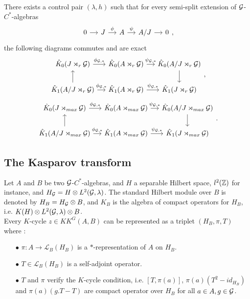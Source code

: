 \begin{prop}
There exists a control pair $(\lambda,h)$ such that for every semi-split extension of $\mathcal G$-$C^*$-algebras
\[\begin{tikzcd}[column sep = small]
0 \arrow{r} & J\arrow{r}{\phi}& A \arrow{r}{\psi} & A/J \arrow{r} & 0
\end{tikzcd},\]
the following diagrams commutes and are exact 
\[\begin{tikzcd}[column sep = small]
\hat K_0(J\rtimes_r \G) \arrow{r}{\phi_{\G,*}}&\hat K_0( A\rtimes_r \G ) \arrow{r}{\psi_{\G,*}} & \hat K_0( A/J\rtimes_r \G) \arrow{d} \\
\hat K_1(A/J\rtimes_r \G) \arrow{u} \arrow{r}{\phi_{\G,*}}& \hat K_1( A\rtimes_r \G ) \arrow{r}{\psi_{\G,*}} & \hat K_1( J\rtimes_r \G)
\end{tikzcd},\]
\[\begin{tikzcd}[column sep = small]
\hat K_0(J\rtimes_{max} \G) \arrow{r}{\phi_{\G,*}}&\hat K_0( A\rtimes_{max} \G ) \arrow{r}{\psi_{\G,*}} & \hat K_0( A/J\rtimes_{max} \G) \arrow{d} \\
\hat K_1(A/J\rtimes_{max} \G) \arrow{u} \arrow{r}{\phi_{\G,*}}& \hat K_1( A\rtimes_{max} \G ) \arrow{r}{\psi_{\G,*}} & \hat K_1( J\rtimes_{max} \G)
\end{tikzcd}.\]
\end{prop}

\subsection{The Kasparov transform}

Let $A$ and $B$ be two $\mathcal G$-$C^*$-algebras, and $H$ a separable Hilbert space, $l^2(\mathbb Z)$ for instance, and $H_\mathcal G= H\otimes L^2(\mathcal G,\lambda)$. The standard Hilbert module over $B$ is denoted by $H_B=H_\mathcal G\otimes B$, and $K_B$ is the algebra of compact operators for $H_B$, i.e. $K(H)\otimes L^2(\mathcal G,\lambda)\otimes B$. \\

Every $K$-cycle $z\in KK^G(A,B)$ can be represented as a triplet $(H_B, \pi, T)$ where :
\begin{itemize}
\item[$\bullet$]$\pi : A\rightarrow \mathcal L_B(H_B)$ is a $*$-representation of $A$ on $H_B$.
\item[$\bullet$]$T\in \mathcal L_B(H_B)$ is a self-adjoint operator.
\item[$\bullet$] $T$ and $\pi$ verify the $K$-cycle condition, i.e. $[T,\pi(a)]$, $\pi(a)(T^2-id_{H_B})$ and $\pi(a)(g.T-T)$ are compact operator over $H_B$ for all $a\in A, g\in \mathcal G$.\\
\end{itemize}

